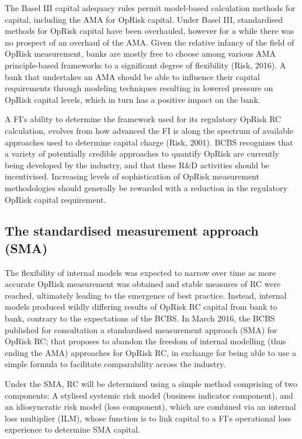 \documentclass[]{DissertateUSU}
\begin{document}
The Basel III capital adequacy rules permit model-based calculation
methods for capital, including the AMA for OpRisk capital. Under Basel
III, standardised methods for OpRisk capital have been overhauled,
however for a while there was no prospect of an overhaul of the AMA.
Given the relative infancy of the field of OpRisk measurement, banks are
mostly free to choose among various AMA principle-based frameworks to a
significant degree of flexibility (Risk, 2016). A bank that undertakes
an AMA should be able to influence their capital requirements through
modeling techniques resulting in lowered pressure on OpRisk capital
levels, which in turn has a positive impact on the bank.\medskip

A FI's ability to determine the framework used for its regulatory OpRisk
RC calculation, evolves from how advanced the FI is along the spectrum
of available approaches used to determine capital charge (Risk, 2001).
BCBS recognizes that a variety of potentially credible approaches to
quantify OpRisk are currently being developed by the industry, and that
these R\&D activities should be incentivised. Increasing levels of
sophistication of OpRisk measurement methodologies should generally be
rewarded with a reduction in the regulatory OpRisk capital requirement.

\subsection{The standardised measurement approach (SMA)}

The flexibility of internal models was expected to narrow over time as
more accurate OpRisk measurement was obtained and stable measures of RC
were reached, ultimately leading to the emergence of best practice.
Instead, internal models produced wildly differing results of OpRisk RC
capital from bank to bank, contrary to the expectations of the BCBS. In
March 2016, the BCBS published for consultation a standardised
measurement approach (SMA) for OpRisk RC; that proposes to abandon the
freedom of internal modelling (thus ending the AMA) approaches for
OpRisk RC, in exchange for being able to use a simple formula to
facilitate comparability across the industry.\medskip

Under the SMA, RC will be determined using a simple method comprising of
two components: A stylised systemic risk model (business indicator
component), and an idiosyncratic risk model (loss component), which are
combined via an internal loss multiplier (ILM), whose function is to
link capital to a FI's operational loss experience to determine SMA
capital.\medskip
\end{document}
